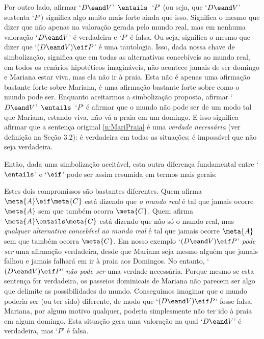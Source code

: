 Por outro lado, afirmar \mbox{`$D \eand V$' $\entails$ `$P$'} (ou seja, que `$D \eand V$' sustenta `$P$') significa algo muito mais forte ainda que isso.
Significa o mesmo que dizer que não apenas na valoração gerada pelo mundo real, mas em nenhuma valoração `$D \eand V$' é verdadeira e `$P$' é falsa.
Ou seja, significa o mesmo que dizer que `$(D \eand V) \eif P$' é uma tautologia.
Isso, dada nossa chave de simbolização, significa que em todas as alternativas concebíveis ao mundo real, em todos os cenários hipotéticos imagináveis, não acontece jamais de ser domingo e Mariana estar viva, mas ela não ir à praia.
Esta não é apenas uma afirmação bastante forte sobre Mariana, é uma afirmação bastante forte sobre como o mundo pode ser.
Enquanto aceitarmos a simbolização proposta, afirmar \mbox{`$D \eand V$' $\entails$ `$P$'} é afirmar que o mundo não pode ser de um modo tal que Mariana, estando viva, não vá a praia em um domingo.
E isso significa afirmar que a sentença original \ref{n:MariPraia} é uma \emph{verdade necessária} (ver definição na Seção 3.2): é verdadeira em todas as situações; é impossível que não seja verdadeira.

Então, dada uma simbolização aceitável, esta outra diferença fundamental entre `$\entails$' e `$\eif$' pode ser assim resumida em termos mais gerais:

Estes dois compromissos são bastantes diferentes.
Quem afirma $\meta{A} \eif \meta{C}$ está dizendo que \emph{o mundo real} é tal que jamais ocorre $\meta{A}$ sem que também ocorra $\meta{C}$.
Quem afirma $\meta{A} \entails \meta{C}$ está dizendo que não só o mundo real, mas \emph{qualquer alternativa concebível ao mundo real} é tal que jamais ocorre $\meta{A}$ sem que também ocorra $\meta{C}$.
Em nosso exemplo `$(D \eand V) \eif P$' \emph{pode ser} uma afirmação verdadeira, desde que Mariana seja mesmo alguém que jamais falhou e jamais falhará em ir à praia aos Domingos.
No entanto, `$(D \eand V) \eif P$' \emph{não pode ser} uma verdade necessária.
Porque mesmo se esta sentença for verdadeira, os passeios dominicais de Mariana não parecem ser algo que delimite as possibilidades do mundo.
Conseguimos imaginar que o mundo poderia ser (ou ter sido) diferente, de modo que `$(D \eand V) \eif P$' fosse falsa.
Mariana, por algum motivo qualquer, poderia simplesmente não ter ido à praia em algum domingo.
Esta situação gera uma valoração na qual `$D \eand V$' é verdadeira, mas `$P$' é falsa.

